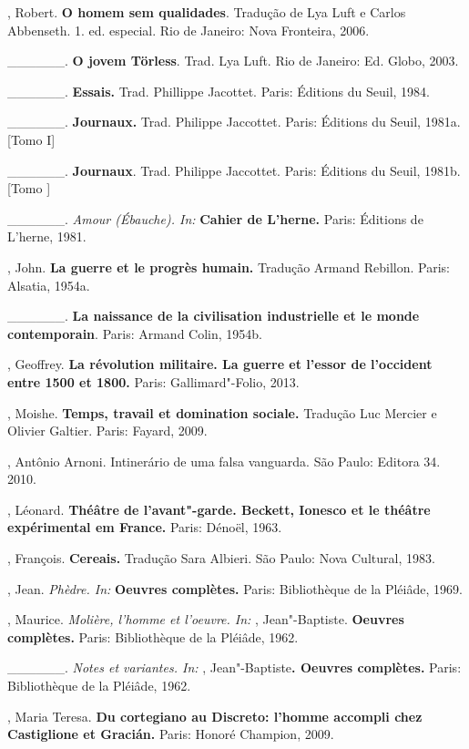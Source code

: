 \begin{Parskip}
, Robert. \textbf{O homem sem qualidades}. Tradução de Lya Luft e
Carlos Abbenseth. 1. ed. especial. Rio de Janeiro: Nova Fronteira, 2006.

\_\_\_\_\_\_. \textbf{O jovem Törless}. Trad. Lya Luft. Rio de Janeiro:
Ed. Globo, 2003.

\_\_\_\_\_\_. \textbf{Essais.} Trad. Phillippe Jacottet. Paris: Éditions
du Seuil, 1984.

\_\_\_\_\_\_. \textbf{Journaux.} Trad. Philippe Jaccottet. Paris:
Éditions du Seuil, 1981a. [Tomo I]

\_\_\_\_\_\_. \textbf{Journaux}. Trad. Philippe Jaccottet. Paris:
Éditions du Seuil, 1981b. [Tomo ]

\_\_\_\_\_\_. \emph{Amour (Ébauche). In:} \textbf{Cahier de L'herne.}
Paris: Éditions de L'herne, 1981.

, John. \textbf{La guerre et le progrès humain.} Tradução Armand
Rebillon. Paris: Alsatia, 1954a.

\_\_\_\_\_\_. \textbf{La naissance de la civilisation industrielle et le
monde contemporain}. Paris: Armand Colin, 1954b.

, Geoffrey. \textbf{La révolution militaire. La guerre et l'essor
de l'occident entre 1500 et 1800.} Paris: Gallimard"-Folio, 2013.

, Moishe. \textbf{Temps, travail et domination sociale.} Tradução
Luc Mercier e Olivier Galtier. Paris: Fayard, 2009.

, Antônio Arnoni. Intinerário de uma falsa vanguarda. São Paulo:
Editora 34. 2010.

, Léonard. \textbf{Théâtre de l'avant"-garde. Beckett, Ionesco et
le théâtre expérimental em France.} Paris: Dénoël, 1963.

, François. \textbf{Cereais.} Tradução Sara Albieri. São Paulo:
Nova Cultural, 1983.

, Jean. \emph{Phèdre. In:} \textbf{Oeuvres complètes.} Paris:
Bibliothèque de la Pléiâde, 1969.

, Maurice. \emph{Molière, l'homme et l'oeuvre. In:} ,
Jean"-Baptiste. \textbf{Oeuvres complètes.} Paris: Bibliothèque de la
Pléiâde, 1962.

\_\_\_\_\_\_. \emph{Notes et variantes. In:} ,
Jean"-Baptiste\textbf{. Oeuvres complètes.} Paris: Bibliothèque de la
Pléiâde, 1962.

, Maria Teresa. \textbf{Du cortegiano au Discreto: l'homme accompli
chez Castiglione et Gracián.} Paris: Honoré Champion, 2009.


\end{Parskip}
